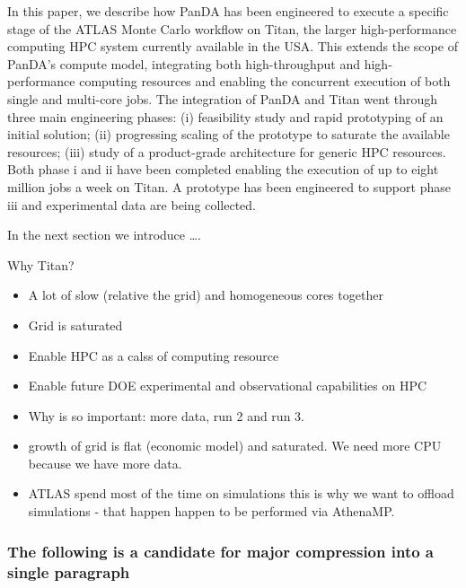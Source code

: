 In this paper, we describe how PanDA has been engineered to execute a specific
stage of the ATLAS Monte Carlo workflow on Titan, the larger high-performance
computing HPC system currently available in the USA\@. This extends
the scope of PanDA's compute model, integrating both high-throughput and
high-performance computing resources and enabling the concurrent execution of
both  single and multi-core jobs. The integration of PanDA and Titan went
through three main engineering phases: (i) feasibility study and rapid
prototyping of an initial solution; (ii) progressing scaling of the  prototype
to saturate the available resources; (iii) study of a product-grade architecture
for generic HPC resources. Both phase i and ii have been completed enabling the
execution of up to eight million jobs a week on Titan. A prototype has been
engineered to support phase iii and experimental data are being collected.

In the next section we introduce \ldots.

Why Titan?
\begin{itemize}
    \item A lot of slow (relative the grid) and homogeneous cores together
    \item Grid is saturated
    \item Enable HPC as a calss of computing resource
    \item Enable future DOE experimental and observational capabilities on HPC
    \item Why is so important: more data, run 2 and run 3.
    \item growth of grid is flat (economic model) and saturated. We need more CPU because we have more data.
    \item ATLAS spend most of the time on simulations this is why we want to offload simulations - that happen happen to be performed via AthenaMP.
\end{itemize}





\subsubsection*{The following is a candidate for major compression into a single paragraph}



